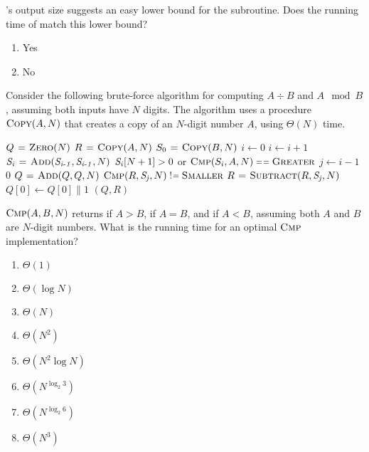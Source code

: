 \documentclass[12pt,twoside]{article}
\newcommand{\isnotequal}{\mathrel{\scalebox{0.8}[1]{!}\hspace*{1pt}\scalebox{0.8}[1]{=}}}
\begin{document}
\begin{problems}
\begin{problemparts}
\problempart {} 's output size suggests an easy lower
bound for the subroutine. Does the running time of  match this
lower bound?
\begin{enumerate}
  \item Yes
  \item No
\end{enumerate}
\end{problemparts}

Consider the following brute-force algorithm for computing $A \div B$ and $A
\mod B$, assuming both inputs have $N$ digits. The algorithm uses a procedure
$\textnormal{\scshape Copy}(A, N)$ that creates a copy of an $N$-digit number $A$, using
$\Theta(N)$ time.

\begin{codebox}
\li $Q \mathrel{\hspace{1pt}=\hspace{1pt}} \textnormal{\scshape Zero}(N)$ 
\li $R \mathrel{\hspace{1pt}=\hspace{1pt}} \textnormal{\scshape Copy}(A, N)$ 
\li $S_0 \mathrel{\hspace{1pt}=\hspace{1pt}} \textnormal{\scshape Copy}(B, N)$ 
\li $i \gets 0$
\li \Repeat \label{li:divmod-repeat}
\li   $i \gets i + 1$
\li   $\id{S_i} \gets \proc{Add}(\id{S_{i - 1}}, \id{S_{i - 1}}, N)$
\li \Until $\id{S_i}[N + 1] > 0$ or $\proc{Cmp}(S_i, A, N) \isequal
            \const{Greater}$
\li \For $j \gets i - 1$ \Downto $0$ \label{li:divmod-for}
\li   \Do
        $Q \mathrel{\hspace{1pt}=\hspace{1pt}} \textnormal{\scshape Add}(Q, Q, N)$
\li     \If $\proc{Cmp}(R, \id{S_j}, N) \isnotequal \const{Smaller}$
\li     \Then
           $R \gets \proc{Subtract}(R, \id{S_j}, N)$
\li        $Q[0] \gets Q[0] \| 1$ 
        \End
      \End
\li \Return $(Q, R)$
\end{codebox}

\begin{problemparts}
\problempart {} $\textnormal{\scshape Cmp}(A, B, N)$ returns  if $A >
B$,  if $A = B$, and  if $A < B$, assuming both $A$
and $B$ are $N$-digit numbers. What is the running time for an optimal
$\textnormal{\scshape Cmp}$ implementation?
\begin{enumerate}
  \item $\Theta(1)$
  \item $\Theta(\log N)$
  \item $\Theta(N)$
  \item $\Theta(N^2)$
  \item $\Theta(N^2 \log N)$
  \item $\Theta(N^{\log_2 3})$
  \item $\Theta(N^{\log_2 6})$
  \item $\Theta(N^3)$
\end{enumerate}
\end{problemparts}
\end{problems}
\end{document}
